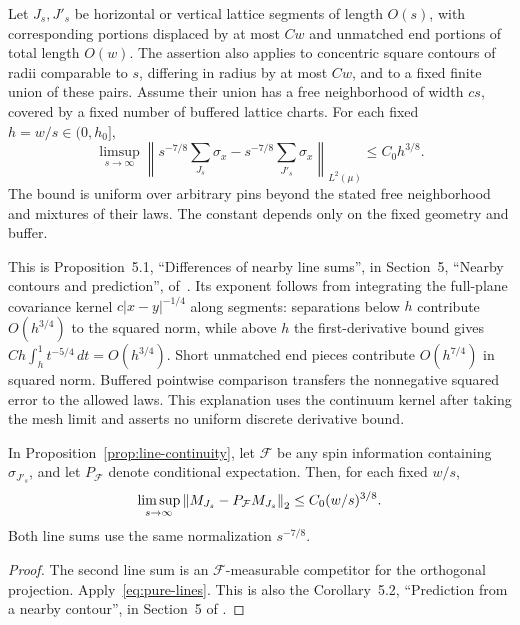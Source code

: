 \begin{proposition}
\label{prop:line-continuity}
Let \(J_s,J'_s\) be horizontal or vertical lattice segments of length
\(O(s)\), with corresponding portions displaced by at most \(Cw\)
and unmatched end portions of total length \(O(w)\). The assertion
also applies to concentric square contours of radii comparable to
\(s\), differing in radius by at most \(Cw\), and to a fixed finite
union of these pairs. Assume their union has a free neighborhood of
width \(cs\), covered by a fixed number of buffered lattice charts.
For each fixed \(h=w/s\in(0,h_0]\),
\begin{equation}
 \limsup_{s\to\infty}
 \left\|s^{-7/8}\sum_{J_s}\sigma_x
       -s^{-7/8}\sum_{J'_s}\sigma_x\right\|_{L^2(\mu)}
 \le C_0h^{3/8}.
 \label{eq:pure-lines}
\end{equation}
The bound is uniform over arbitrary pins beyond the stated free
neighborhood and mixtures of their laws. The constant depends only on
the fixed geometry and buffer.
\end{proposition}

This is Proposition~5.1, ``Differences of nearby line sums'', in Section~5,
``Nearby contours and prediction'', of~\cite{OpenAIStatic2026}. Its exponent follows from integrating
the full-plane covariance kernel \(c|x-y|^{-1/4}\) along segments:
separations below \(h\) contribute \(O(h^{3/4})\) to the squared
norm, while above \(h\) the first-derivative bound gives
\(Ch\int_h^1t^{-5/4}\,dt=O(h^{3/4})\). Short unmatched end pieces
contribute \(O(h^{7/4})\) in squared norm. Buffered pointwise
comparison transfers the nonnegative squared error to the allowed
laws. This explanation uses the continuum kernel after taking the
mesh limit and asserts no uniform discrete derivative bound.

\begin{corollary}
\label{cor:line-prediction}
In Proposition~\ref{prop:line-continuity}, let \(\mathcal F\) be any
spin information containing \(\sigma_{J'_s}\), and let
\(P_{\mathcal F}\) denote conditional expectation. Then, for each
fixed \(w/s\),
\[
 \limsup_{s\to\infty}
 \left\|M_{J_s}-P_{\mathcal F}M_{J_s}\right\|_2
 \le C_0(w/s)^{3/8}.
\]
Both line sums use the same normalization \(s^{-7/8}\).
\end{corollary}

\begin{proof}
The second line sum is an \(\mathcal F\)-measurable competitor for the
orthogonal projection. Apply~\eqref{eq:pure-lines}. This is also the
Corollary~5.2, ``Prediction from a nearby contour'', in Section~5 of
\cite{OpenAIStatic2026}.
\end{proof}


